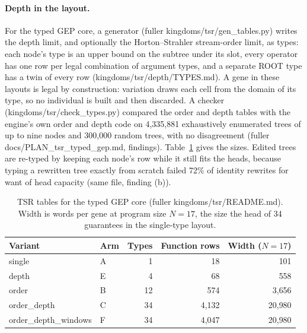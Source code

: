 \documentclass[sigconf,nonacm]{acmart}
\newcommand{\ty}[1]{\textsf{#1}}
\newcommand{\src}[1]{{\small\ttfamily #1}}
\begin{document}
\paragraph{Depth in the layout.} For the typed GEP core, a generator
(\src{fuller kingdoms/\allowbreak{}tsr/\allowbreak{}gen\_\allowbreak{}tables.\allowbreak{}py}) writes the depth limit, and
optionally the Horton--Strahler stream-order limit, as types: each node's type
is an upper bound on the subtree under its slot, every operator has one row per
legal combination of argument types, and a separate \ty{ROOT} type has a twin of
every row (\src{kingdoms/\allowbreak{}tsr/\allowbreak{}depth/\allowbreak{}TYPES.\allowbreak{}md}). A gene in these layouts is legal
by construction: variation draws each cell from the domain of its type, so no
individual is built and then discarded. A checker
(\src{kingdoms/\allowbreak{}tsr/\allowbreak{}check\_\allowbreak{}types.\allowbreak{}py}) compared the order and depth tables with
the engine's own order and depth code on 4{,}335{,}881 exhaustively enumerated
trees of up to nine nodes and 300{,}000 random trees, with no disagreement
(\src{fuller docs/\allowbreak{}PLAN\_\allowbreak{}tsr\_\allowbreak{}typed\_\allowbreak{}gep.\allowbreak{}md}, findings). Table~\ref{tab:variants}
gives the sizes. Edited trees are re-typed by keeping each node's row while it
still fits the heads, because typing a rewritten tree exactly from scratch
failed 72\% of identity rewrites for want of head capacity (same file, finding
(b)).

\begin{table}[t]
\caption{TSR tables for the typed GEP core
(\src{fuller kingdoms/\allowbreak{}tsr/\allowbreak{}README.\allowbreak{}md}). Width is words per gene at program
size $N=17$, the size the head of 34 guarantees in the single-type layout.}
\label{tab:variants}
\small
\begin{tabular}{@{}llrrr@{}}
\toprule
Variant & Arm & Types & Function rows & Width ($N{=}17$) \\
\midrule
single & A & 1 & 18 & 101 \\
depth & E & 4 & 68 & 558 \\
order & B & 12 & 574 & 3{,}656 \\
order\_depth & C & 34 & 4{,}132 & 20{,}980 \\
order\_depth\_windows & F & 34 & 4{,}047 & 20{,}980 \\
\bottomrule
\end{tabular}
\end{table}
\end{document}
